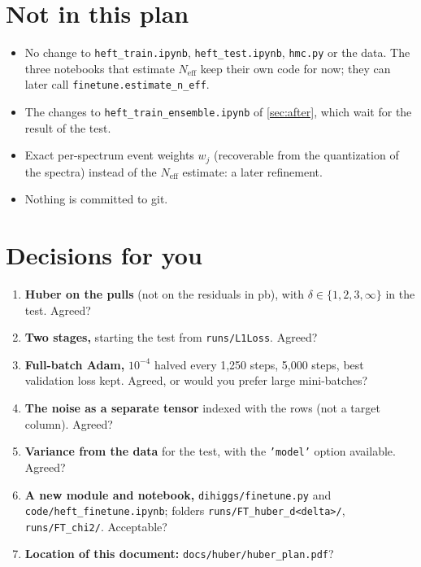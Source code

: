 \documentclass[11pt]{article}
\newcommand{\file}[1]{\nolinkurl{#1}}
\newcommand{\code}[1]{\texttt{#1}}
\begin{document}
\section{Not in this plan}
\begin{itemize}
  \item No change to \file{heft_train.ipynb}, \file{heft_test.ipynb}, \file{hmc.py} or the
    data. The three notebooks that estimate $N_\text{eff}$ keep their own code for now;
    they can later call \code{finetune.estimate\_n\_eff}.
  \item The changes to \file{heft_train_ensemble.ipynb} of \cref{sec:after}, which wait
    for the result of the test.
  \item Exact per-spectrum event weights $w_j$ (recoverable from the quantization of the
    spectra) instead of the $N_\text{eff}$ estimate: a later refinement.
  \item Nothing is committed to git.
\end{itemize}

\section{Decisions for you}
\label{sec:decisions}

\begin{keyidea}
\begin{enumerate}
  \item \textbf{Huber on the pulls} (not on the residuals in pb), with
    $\delta \in \{1, 2, 3, \infty\}$ in the test. Agreed?
  \item \textbf{Two stages,} starting the test from \file{runs/L1Loss}. Agreed?
  \item \textbf{Full-batch Adam,} $10^{-4}$ halved every 1,250 steps, 5,000 steps, best
    validation loss kept. Agreed, or would you prefer large mini-batches?
  \item \textbf{The noise as a separate tensor} indexed with the rows (not a target column).
    Agreed?
  \item \textbf{Variance from the data} for the test, with the \code{'model'} option
    available. Agreed?
  \item \textbf{A new module and notebook,} \file{dihiggs/finetune.py} and
    \file{code/heft_finetune.ipynb}; folders \file{runs/FT_huber_d<delta>/},
    \file{runs/FT_chi2/}. Acceptable?
  \item \textbf{Location of this document:} \file{docs/huber/huber_plan.pdf}?
\end{enumerate}
\end{keyidea}
\end{document}
